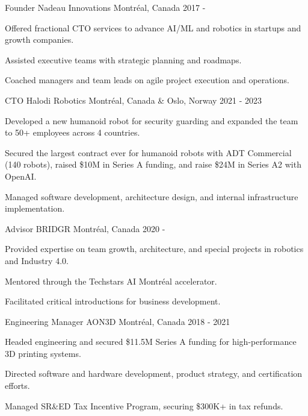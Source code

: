 \begin{cventries}

    \cventry
    {Founder}
    {Nadeau Innovations}
    {Montréal, Canada}
    {2017 - }
    {
        \begin{cvitems}
            \item{Offered fractional CTO services to advance AI/ML and robotics in startups and growth companies.}
            \item{Assisted executive teams with strategic planning and roadmaps.}
            \item{Coached managers and team leads on agile project execution and operations.}
        \end{cvitems}
    }

    \cventry
    {CTO}
    {Halodi Robotics}
    {Montréal, Canada \& Oslo, Norway}
    {2021 - 2023}
    {
        \begin{cvitems}
            \item{Developed a new humanoid robot for security guarding and expanded the team to 50+ employees across 4 countries.}
            \item{Secured the largest contract ever for humanoid robots with ADT Commercial (140 robots), raised \$10M in Series A funding, and raise \$24M in Series A2 with OpenAI.}
            \item{Managed software development, architecture design, and internal infrastructure implementation.}
        \end{cvitems}
    }

    \cventry
    {Advisor}
    {BRIDGR}
    {Montréal, Canada}
    {2020 - }
    {
        \begin{cvitems}
            \item{Provided expertise on team growth, architecture, and special projects in robotics and Industry 4.0.}
            \item{Mentored through the Techstars AI Montréal accelerator.}
            \item{Facilitated critical introductions for business development.}
            \end{cvitems}
    }

    \cventry
    {Engineering Manager}
    {AON3D}
    {Montréal, Canada}
    {2018 - 2021}
    {
        \begin{cvitems}
            \item{Headed engineering and secured \$11.5M Series A funding for high-performance 3D printing systems.}
            \item{Directed software and hardware development, product strategy, and certification efforts.}
            \item{Managed SR&ED Tax Incentive Program, securing \$300K+ in tax refunds.}
        \end{cvitems}
    }



\end{cventries}
